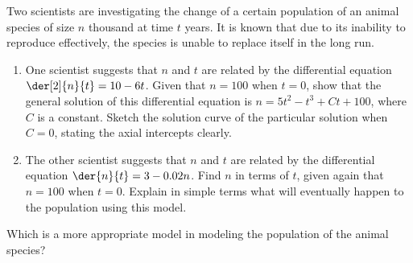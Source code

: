 \begin{problem}
    Two scientists are investigating the change of a certain population of an animal species of size $n$ thousand at time $t$ years. It is known that due to its inability to reproduce effectively, the species is unable to replace itself in the long run.
    \begin{enumerate}
        \item One scientist suggests that $n$ and $t$ are related by the differential equation $\der[2]{n}{t} = 10 - 6t$. Given that $n = 100$ when $t = 0$, show that the general solution of this differential equation is $n = 5t^2 - t^3 + Ct + 100$, where $C$ is a constant. Sketch the solution curve of the particular solution when $C = 0$, stating the axial intercepts clearly.
        \item The other scientist suggests that $n$ and $t$ are related by the differential equation $\der{n}{t} = 3 - 0.02n$. Find $n$ in terms of $t$, given again that $n = 100$ when $t = 0$. Explain in simple terms what will eventually happen to the population using this model.
    \end{enumerate}
    Which is a more appropriate model in modeling the population of the animal species?
\end{problem}
